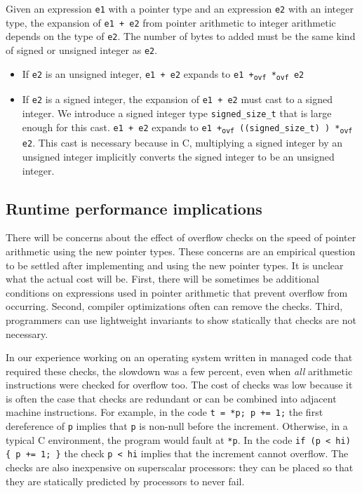 Given an expression \texttt{e1} with a pointer type and an expression
\texttt{e2} with an integer type, the expansion of \texttt{e1 + e2} from
pointer arithmetic to integer arithmetic depends on the type of
\texttt{e2}. The number of bytes to added must be the same kind of
signed or unsigned integer as \texttt{e2}.

\begin{itemize}
\item
  If \texttt{e2} is an unsigned integer, \texttt{e1 + e2} expands to
  \texttt{e1 +\textsubscript{ovf}  *\textsubscript{ovf} e2}
\item
  If \texttt{e2} is a signed integer, the expansion of \texttt{e1 + e2}
  must cast  to a signed integer. We introduce a
  signed integer type \texttt{signed\_size\_t} that is large enough for
  this cast. \texttt{e1 + e2} expands to \texttt{e1 +\textsubscript{ovf}
  ((signed\_size\_t) ) *\textsubscript{ovf} e2}. This cast is
  necessary because in C, multiplying a signed integer by an unsigned
  integer implicitly converts the signed integer to be an unsigned
  integer.
\end{itemize}

\subsection{Runtime performance implications}

There will be concerns about the effect of overflow checks on the speed
of pointer arithmetic using the new pointer types. These concerns are an
empirical question to be settled after implementing and using the new
pointer types. It is unclear what the actual cost will be. First, there
will be sometimes be additional conditions on expressions used in
pointer arithmetic that prevent overflow from occurring. Second,
compiler optimizations often can remove the checks. Third, programmers
can use lightweight invariants to show statically that checks are not
necessary.

In our experience working on an operating system written in managed code
that required these checks, the slowdown was a few percent, even when
\emph{all} arithmetic instructions were checked for overflow too. The
cost of checks was low because it is often the case that checks are
redundant or can be combined into adjacent machine instructions. For
example, in the code \texttt{t = *p; p += 1;} the first dereference of
\texttt{p} implies that \texttt{p} is non-null before the increment.
Otherwise, in a typical C environment, the program would fault at
\texttt{*p}. In the code \verb|if (p < hi) { p += 1; }|
the check \texttt{p < hi} implies that the increment cannot
overflow. The checks are also inexpensive on superscalar processors:
they can be placed so that they are statically predicted by 
processors to never fail.

